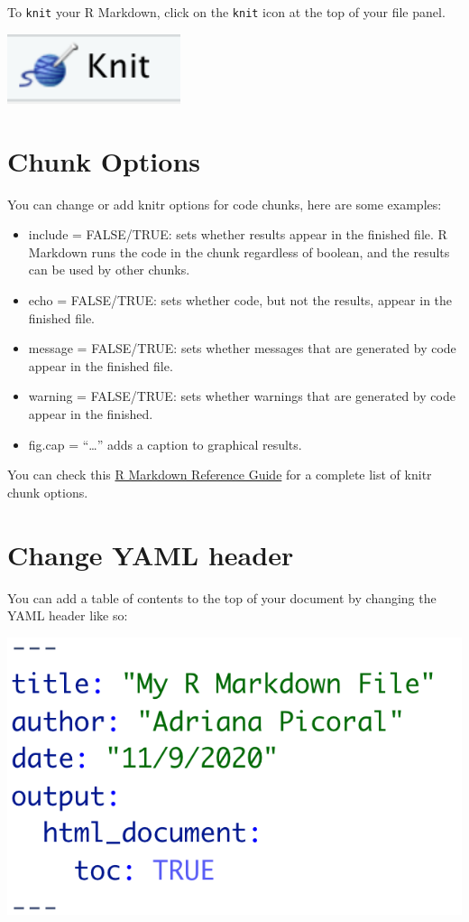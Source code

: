 \documentclass[
]{book}
\begin{document}
To \texttt{knit} your R Markdown, click on the \texttt{knit} icon at the top of your file panel.

\includegraphics[width=2in]{images/knit_icon}

\hypertarget{chunk-options}{%
\section{Chunk Options}\label{chunk-options}}

You can change or add knitr options for code chunks, here are some examples:

\begin{itemize}
\item
  include = FALSE/TRUE: sets whether results appear in the finished file. R Markdown runs the code in the chunk regardless of boolean, and the results can be used by other chunks.
\item
  echo = FALSE/TRUE: sets whether code, but not the results, appear in the finished file.
\item
  message = FALSE/TRUE: sets whether messages that are generated by code appear in the finished file.
\item
  warning = FALSE/TRUE: sets whether warnings that are generated by code appear in the finished.
\item
  fig.cap = ``\ldots{}'' adds a caption to graphical results.
\end{itemize}

You can check this \href{https://rstudio.com/wp-content/uploads/2015/03/rmarkdown-reference.pdf?_ga=2.164770041.799329688.1604856038-376910529.1566581971}{R Markdown Reference Guide} for a complete list of knitr chunk options.

\hypertarget{change-yaml-header}{%
\section{Change YAML header}\label{change-yaml-header}}

You can add a table of contents to the top of your document by changing the YAML header like so:

\includegraphics[width=8.67in]{images/toc_header}
\end{document}
